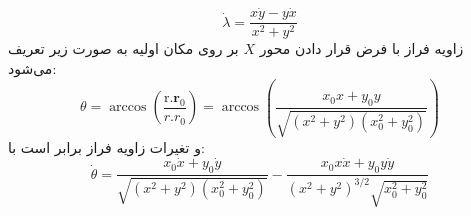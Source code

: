 \begin{equation}
    \label{eq:7}
    \dot{\lambda} = \dfrac{x\dot{y} - y\dot{x}}{x^2 + y^2}
\end{equation}
زاویه فراز با فرض قرار دادن محور  
$X$
بر روی مکان اولیه
به صورت زیر تعریف می‌شود:
\begin{equation}
    \label{eq:8}
    \theta = \arccos\left(\dfrac{\boldsymbol{\mathrm{r}}.\boldsymbol{r}_0}{r.r_0}\right) = \arccos\left(\dfrac{x_0x + y_0y}{\sqrt{(x^2 + y^2)(x_0^2 + y_0^2)}}\right)
\end{equation}
و تغیرات زاویه فراز برابر است با:
\begin{equation}
    \label{eq:9}
    \dot{\theta} = \dfrac{x_0\dot{x} + y_0\dot{y}}{\sqrt{(x^2 + y^2)(x_0^2 + y_0^2)}} - \dfrac{x_0x\dot{x} + y_0y\dot{y}}{(x^2 + y^2)^{3/2}\sqrt{x_0^2 + y_0^2}}
\end{equation}


